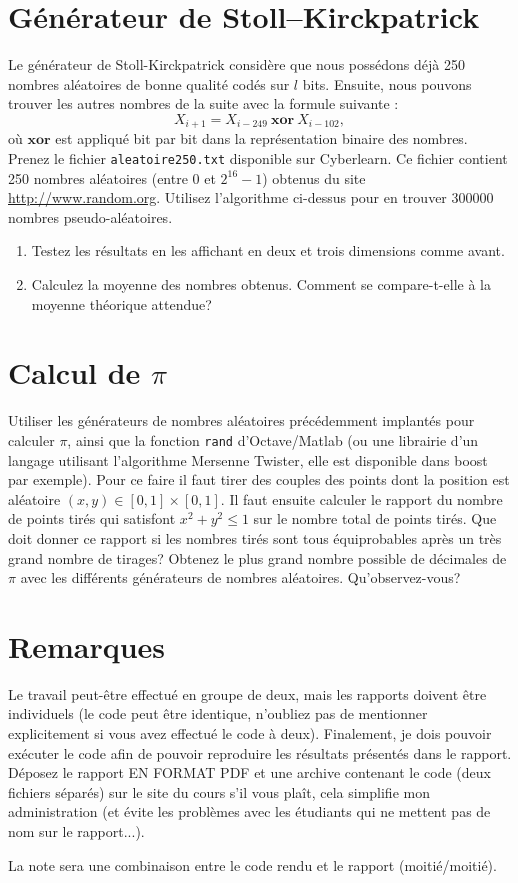 \documentclass[a4paper,10pt]{article}
\begin{document}
\section*{Générateur de Stoll--Kirckpatrick}
Le générateur de Stoll-Kirckpatrick considère que nous possédons déjà 250 nombres aléatoires de
bonne qualité codés sur $l$ bits. Ensuite, nous pouvons trouver les autres nombres de la suite avec la
formule suivante :
\begin{equation}
X_{i+1} = X_{i-249}\ \bm{xor}\ X_{i-102},
\end{equation}
où $\bm{xor}$ est appliqué bit par bit dans la représentation binaire des nombres.
Prenez le fichier \texttt{aleatoire250.txt} disponible sur Cyberlearn. Ce fichier contient 250 nombres aléatoires (entre 0
et $2^{16}-1$) obtenus du site \url{http://www.random.org}. Utilisez l’algorithme ci-dessus pour en trouver 300000
nombres pseudo-aléatoires.
\begin{enumerate}
 \item Testez les résultats en les affichant en deux et trois dimensions comme avant.
 \item Calculez la moyenne des nombres obtenus. Comment se compare-t-elle à la moyenne théorique attendue?
\end{enumerate}


\section*{Calcul de $\pi$}

Utiliser les générateurs de nombres aléatoires précédemment implantés pour calculer $\pi$, ainsi que la fonction \texttt{rand} d'Octave/Matlab (ou
une librairie d'un langage utilisant l'algorithme Mersenne Twister, elle est disponible dans boost par exemple). Pour ce faire
il faut tirer des couples des points dont la position est aléatoire $(x,y)\in [0,1]\times[0,1]$. Il faut ensuite calculer le rapport du nombre de points
tirés qui satisfont $x^2+y^2\leq 1$ sur le nombre total de points tirés. Que doit donner ce rapport si les nombres tirés sont
tous équiprobables après un très grand nombre de tirages? Obtenez le plus grand nombre possible de décimales de $\pi$
avec les différents générateurs de nombres aléatoires. Qu'observez-vous?


\section*{Remarques}

Le travail peut-être effectué en groupe de deux, mais les rapports doivent être individuels (le code peut être identique, n'oubliez pas de mentionner 
explicitement si vous avez effectué le code à deux). 
Finalement, je dois pouvoir exécuter le code
afin de pouvoir reproduire les résultats présentés dans le rapport. 
Déposez le rapport EN FORMAT PDF et une archive contenant le code (deux fichiers séparés) 
sur le site du cours s'il vous plaît, cela simplifie mon administration (et évite les problèmes avec les étudiants qui 
ne mettent pas de nom sur le rapport...).

La note sera une combinaison entre le code rendu et le rapport (moitié/moitié). 
\end{document}

